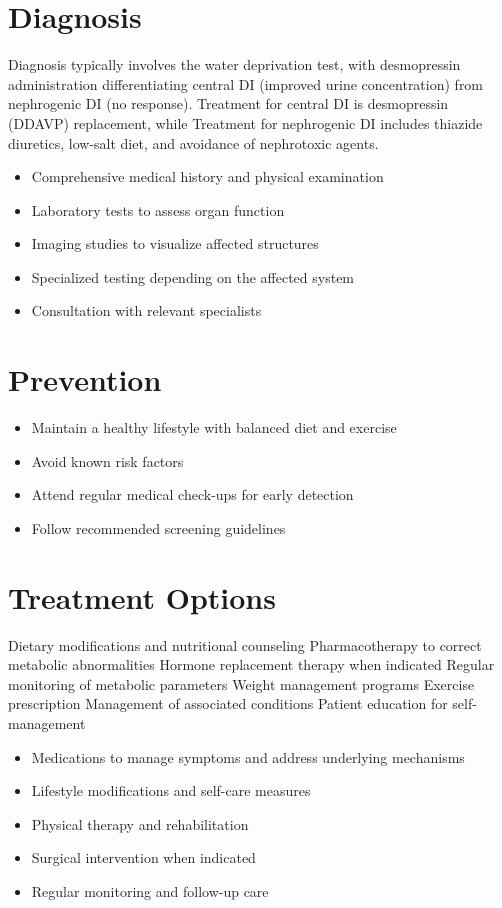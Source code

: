 \section{Diagnosis}
Diagnosis typically involves the water deprivation test, with desmopressin administration differentiating central DI (improved urine concentration) from nephrogenic DI (no response). Treatment for central DI is desmopressin (DDAVP) replacement, while Treatment for nephrogenic DI includes thiazide diuretics, low-salt diet, and avoidance of nephrotoxic agents.

\begin{itemize}[noitemsep]
  \item Comprehensive medical history and physical examination
  \item Laboratory tests to assess organ function
  \item Imaging studies to visualize affected structures
  \item Specialized testing depending on the affected system
  \item Consultation with relevant specialists
\end{itemize}
\section{Prevention}
\begin{itemize}[noitemsep]
  \item Maintain a healthy lifestyle with balanced diet and exercise
  \item Avoid known risk factors
  \item Attend regular medical check-ups for early detection
  \item Follow recommended screening guidelines
\end{itemize}
\section{Treatment Options}
Dietary modifications and nutritional counseling Pharmacotherapy to correct metabolic abnormalities Hormone replacement therapy when indicated Regular monitoring of metabolic parameters Weight management programs Exercise prescription Management of associated conditions Patient education for self-management

\begin{itemize}[noitemsep]
  \item Medications to manage symptoms and address underlying mechanisms
  \item Lifestyle modifications and self-care measures
  \item Physical therapy and rehabilitation
  \item Surgical intervention when indicated
  \item Regular monitoring and follow-up care
\end{itemize}
